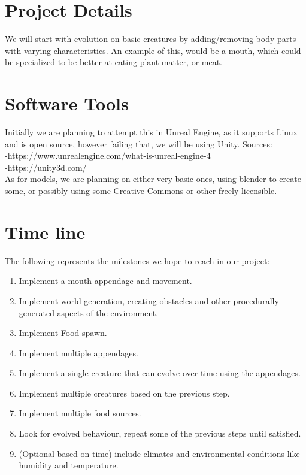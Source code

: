 \documentclass[runningheads]{llncs}
\begin{document}
\section{Project Details}
We will start with evolution on basic creatures by adding/removing body parts with varying characteristics. An example of this, would be a mouth, which could be specialized to be better at eating plant matter, or meat.

\section{Software Tools}
Initially we are planning to attempt this in Unreal Engine, as it supports Linux and is open source, however failing that, we will be using Unity.
Sources: 
\\
-https://www.unrealengine.com/what-is-unreal-engine-4
\\
-https://unity3d.com/
\\
As for models, we are planning on either very basic ones, using blender to create some, or possibly using some Creative Commons or other freely licensible.

\section{Time line}
The following represents the milestones we hope to reach in our project:
\begin{enumerate}
\item Implement a mouth appendage and movement.
\item Implement world generation, creating obstacles and other procedurally generated aspects of the environment.
\item Implement Food-spawn.
\item Implement multiple appendages.
\item Implement a single creature that can evolve over time using the appendages.
\item Implement multiple creatures based on the previous step.
\item Implement multiple food sources.
\item Look for evolved behaviour, repeat some of the previous steps until satisfied.
\item (Optional based on time) include climates and environmental conditions like humidity and temperature.
\end{enumerate}





\end{document}
